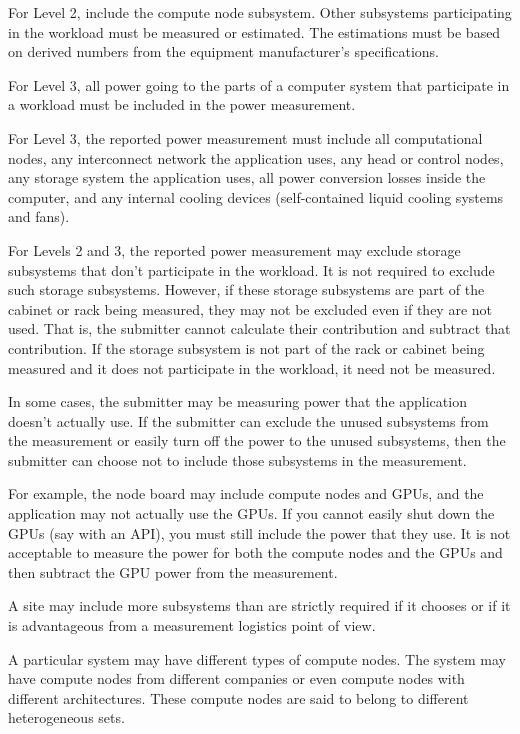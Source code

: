 \noindent
For Level 2,  include the compute node subsystem. Other subsystems participating in the workload must be measured or estimated. The estimations must be based on derived numbers from the equipment manufacturer's specifications. 
\wl


\noindent
For Level 3, all power going to the parts of a computer system that participate in a workload must be included in the power measurement. 
\wl

\noindent
For Level 3, the reported power measurement must include all computational nodes, any interconnect network the application uses, any head or control nodes, any storage system the application uses, all power conversion losses inside the computer, and any internal cooling devices (self-contained liquid cooling systems and fans).  
\wl

\noindent
For Levels 2 and 3, the reported power measurement may exclude storage subsystems that don't participate in the workload. It is not required to exclude such storage subsystems. However, if these storage subsystems are part of the cabinet or rack being measured, they may not be excluded even if they are not used. That is, the submitter cannot calculate their contribution and subtract that contribution. If the storage subsystem is not part of the rack or cabinet being measured and it does not participate in the workload, it need not be measured.
\wl

\noindent
In some cases, the submitter may be measuring power that the application doesn't actually use. If the submitter can exclude the unused subsystems from the measurement or easily turn off the power to the unused subsystems, then the submitter can choose not to include those subsystems in the measurement. 
\wl

\noindent
For example, the node board may include compute nodes and GPUs, and the application may not actually use the GPUs.  If you cannot easily shut down the GPUs (say with an API), you must still include the power that they use. It is not acceptable to measure the power for both the compute nodes and the GPUs and then subtract the GPU power from the measurement.
\wl

\noindent
A site may include more subsystems than are strictly required if it chooses or if it is advantageous from a measurement logistics point of view.  
\wl

\noindent
A particular system may have different types of compute nodes. The system may have compute nodes from different companies or even compute nodes with different architectures. These compute nodes are said to belong to different heterogeneous sets.
\wl

